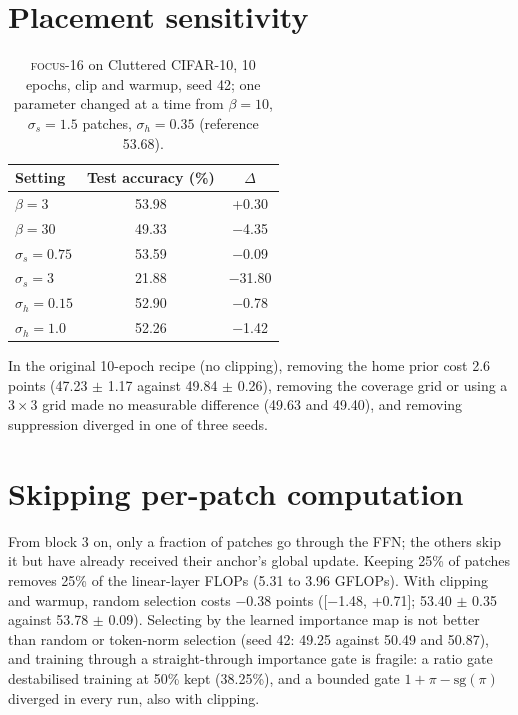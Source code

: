 \documentclass[10pt]{article}
\newcommand{\focus}{\textsc{focus}}
\begin{document}
\section{Placement sensitivity}
\label{app:sensitivity}
\begin{table}[h]
\centering
\caption{\focus-16 on Cluttered CIFAR-10, 10 epochs, clip and warmup, seed 42; one parameter
changed at a time from $\beta=10$, $\sigma_s=1.5$ patches, $\sigma_h=0.35$ (reference 53.68).}
\begin{tabular}{lcc}
\toprule
Setting & Test accuracy (\%) & $\Delta$ \\
\midrule
$\beta=3$ & 53.98 & +0.30 \\
$\beta=30$ & 49.33 & $-$4.35 \\
$\sigma_s=0.75$ & 53.59 & $-$0.09 \\
$\sigma_s=3$ & 21.88 & $-$31.80 \\
$\sigma_h=0.15$ & 52.90 & $-$0.78 \\
$\sigma_h=1.0$ & 52.26 & $-$1.42 \\
\bottomrule
\end{tabular}
\end{table}
In the original 10-epoch recipe (no clipping), removing the home prior cost 2.6 points
(47.23 $\pm$ 1.17 against 49.84 $\pm$ 0.26), removing the coverage grid or using a $3\times3$ grid
made no measurable difference (49.63 and 49.40), and removing suppression diverged in one of
three seeds.

\section{Skipping per-patch computation}
\label{app:skipping}
From block 3 on, only a fraction of patches go through the FFN; the others skip it but have already
received their anchor's global update. Keeping 25\% of patches removes 25\% of the linear-layer
FLOPs (5.31 to 3.96 GFLOPs). With clipping and warmup, random selection costs $-$0.38 points
([$-$1.48, +0.71]; 53.40 $\pm$ 0.35 against 53.78 $\pm$ 0.09). Selecting by the learned importance
map is not better than random or token-norm selection (seed 42: 49.25 against 50.49 and 50.87),
and training through a straight-through importance gate is fragile: a ratio gate destabilised
training at 50\% kept (38.25\%), and a bounded gate $1+\pi-\mathrm{sg}(\pi)$ diverged in every
run, also with clipping.
\end{document}
